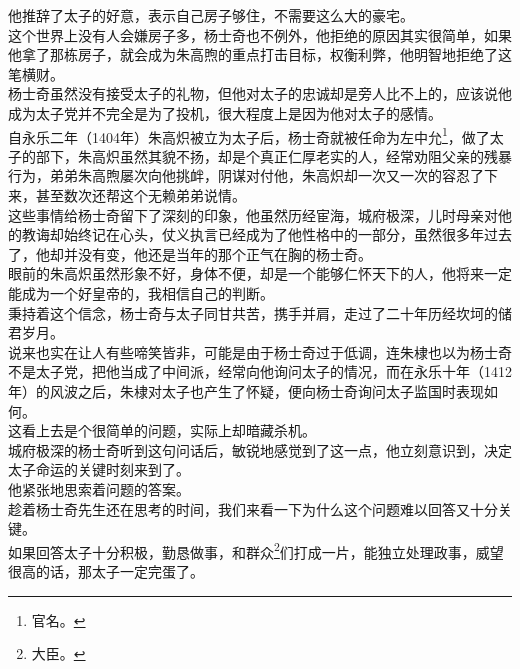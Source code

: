 \begin{multicols}{\theparacolNo}
他推辞了太子的好意，表示自己房子够住，不需要这么大的豪宅。\\

这个世界上没有人会嫌房子多，杨士奇也不例外，他拒绝的原因其实很简单，如果他拿了那栋房子，就会成为朱高煦的重点打击目标，权衡利弊，他明智地拒绝了这笔横财。\\

杨士奇虽然没有接受太子的礼物，但他对太子的忠诚却是旁人比不上的，应该说他成为太子党并不完全是为了投机，很大程度上是因为他对太子的感情。\\

自永乐二年（1404年）朱高炽被立为太子后，杨士奇就被任命为左中允\footnote{官名。}，做了太子的部下，朱高炽虽然其貌不扬，却是个真正仁厚老实的人，经常劝阻父亲的残暴行为，弟弟朱高煦屡次向他挑衅，阴谋对付他，朱高炽却一次又一次的容忍了下来，甚至数次还帮这个无赖弟弟说情。\\

这些事情给杨士奇留下了深刻的印象，他虽然历经宦海，城府极深，儿时母亲对他的教诲却始终记在心头，仗义执言已经成为了他性格中的一部分，虽然很多年过去了，他却并没有变，他还是当年的那个正气在胸的杨士奇。\\

眼前的朱高炽虽然形象不好，身体不便，却是一个能够仁怀天下的人，他将来一定能成为一个好皇帝的，我相信自己的判断。\\

秉持着这个信念，杨士奇与太子同甘共苦，携手并肩，走过了二十年历经坎坷的储君岁月。\\

说来也实在让人有些啼笑皆非，可能是由于杨士奇过于低调，连朱棣也以为杨士奇不是太子党，把他当成了中间派，经常向他询问太子的情况，而在永乐十年（1412年）的风波之后，朱棣对太子也产生了怀疑，便向杨士奇询问太子监国时表现如何。\\

这看上去是个很简单的问题，实际上却暗藏杀机。\\

城府极深的杨士奇听到这句问话后，敏锐地感觉到了这一点，他立刻意识到，决定太子命运的关键时刻来到了。\\

他紧张地思索着问题的答案。\\

趁着杨士奇先生还在思考的时间，我们来看一下为什么这个问题难以回答又十分关键。\\

如果回答太子十分积极，勤恳做事，和群众\footnote{大臣。}们打成一片，能独立处理政事，威望很高的话，那太子一定完蛋了。\\


\end{multicols}
